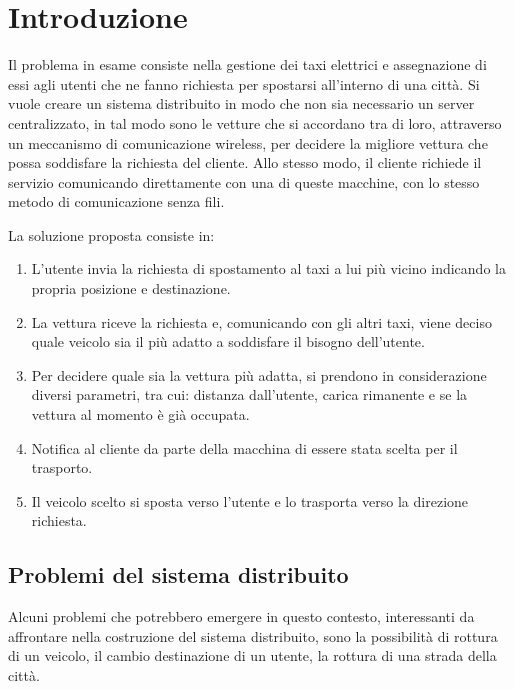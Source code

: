 
\chapter{Introduzione}

Il problema in esame consiste nella gestione dei taxi elettrici e assegnazione di essi agli utenti che ne fanno richiesta per spostarsi all'interno di una città. Si vuole creare un sistema distribuito in modo che non sia necessario un server centralizzato, in tal modo sono le vetture che si accordano tra di loro, attraverso un meccanismo di comunicazione wireless, per decidere la migliore vettura che possa soddisfare la richiesta del cliente. Allo stesso modo, il cliente richiede il servizio comunicando direttamente con una di queste macchine, con lo stesso metodo di comunicazione senza fili. 

La soluzione proposta consiste in:
\begin{enumerate}
	\item L'utente invia la richiesta di spostamento al taxi a lui più vicino indicando la propria posizione e destinazione.
	\item La vettura riceve la richiesta e, comunicando con gli altri taxi, viene deciso quale veicolo sia il più adatto a soddisfare il bisogno dell'utente.
	\item Per decidere quale sia la vettura più adatta, si prendono in considerazione diversi parametri, tra cui: distanza dall'utente, carica rimanente e se la vettura al momento è già occupata.
	\item Notifica al cliente da parte della macchina di essere stata scelta per il trasporto.
	\item Il veicolo scelto si sposta verso l'utente e lo trasporta verso la direzione richiesta.
\end{enumerate}

\section{Problemi del sistema distribuito} \label{problematiche_distribuite}

Alcuni problemi che potrebbero emergere in questo contesto, interessanti da affrontare nella costruzione del sistema distribuito, sono la possibilità di rottura di un veicolo, il cambio destinazione di un utente, la rottura di una strada della città.

